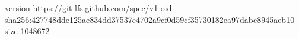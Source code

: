 version https://git-lfs.github.com/spec/v1
oid sha256:427748dde125ae834dd37537e4702a9cf0d59cf35730182ea97dabe8945aeb10
size 1048672
